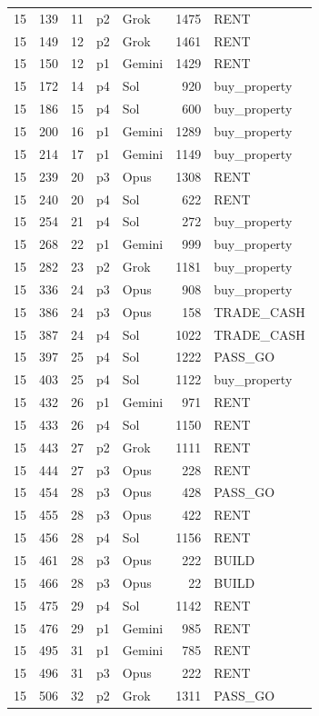 \begin{longtable}{r r r l l r L{2.2in}}
15 & 139 & 11 & p2 & Grok & 1475 & RENT \\
15 & 149 & 12 & p2 & Grok & 1461 & RENT \\
15 & 150 & 12 & p1 & Gemini & 1429 & RENT \\
15 & 172 & 14 & p4 & Sol & 920 & buy\_property \\
15 & 186 & 15 & p4 & Sol & 600 & buy\_property \\
15 & 200 & 16 & p1 & Gemini & 1289 & buy\_property \\
15 & 214 & 17 & p1 & Gemini & 1149 & buy\_property \\
15 & 239 & 20 & p3 & Opus & 1308 & RENT \\
15 & 240 & 20 & p4 & Sol & 622 & RENT \\
15 & 254 & 21 & p4 & Sol & 272 & buy\_property \\
15 & 268 & 22 & p1 & Gemini & 999 & buy\_property \\
15 & 282 & 23 & p2 & Grok & 1181 & buy\_property \\
15 & 336 & 24 & p3 & Opus & 908 & buy\_property \\
15 & 386 & 24 & p3 & Opus & 158 & TRADE\_CASH \\
15 & 387 & 24 & p4 & Sol & 1022 & TRADE\_CASH \\
15 & 397 & 25 & p4 & Sol & 1222 & PASS\_GO \\
15 & 403 & 25 & p4 & Sol & 1122 & buy\_property \\
15 & 432 & 26 & p1 & Gemini & 971 & RENT \\
15 & 433 & 26 & p4 & Sol & 1150 & RENT \\
15 & 443 & 27 & p2 & Grok & 1111 & RENT \\
15 & 444 & 27 & p3 & Opus & 228 & RENT \\
15 & 454 & 28 & p3 & Opus & 428 & PASS\_GO \\
15 & 455 & 28 & p3 & Opus & 422 & RENT \\
15 & 456 & 28 & p4 & Sol & 1156 & RENT \\
15 & 461 & 28 & p3 & Opus & 222 & BUILD \\
15 & 466 & 28 & p3 & Opus & 22 & BUILD \\
15 & 475 & 29 & p4 & Sol & 1142 & RENT \\
15 & 476 & 29 & p1 & Gemini & 985 & RENT \\
15 & 495 & 31 & p1 & Gemini & 785 & RENT \\
15 & 496 & 31 & p3 & Opus & 222 & RENT \\
15 & 506 & 32 & p2 & Grok & 1311 & PASS\_GO \\

\end{longtable}
